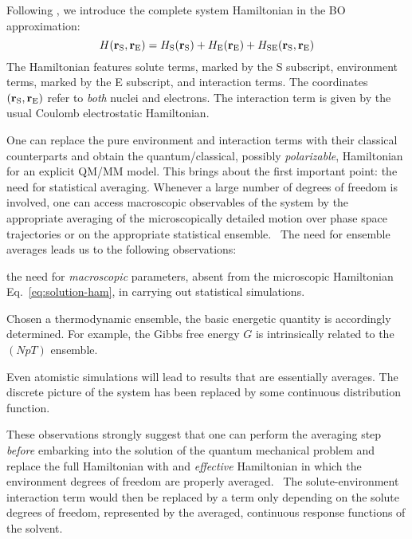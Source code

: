 Following \citeauthor{Tomasi2007-es}, we introduce the complete system
Hamiltonian in the \acs{BO} approximation:~\autocite{Tomasi2004-dc,
Tomasi2007-es}
\begin{equation}\label{eq:solution-ham}
 H(\mathbf{r}_\mathrm{S}, \mathbf{r}_\mathrm{E}) =
  H_\mathrm{S}(\mathbf{r}_\mathrm{S}) +  H_\mathrm{E}(\mathbf{r}_\mathrm{E})
+ H_\mathrm{SE}(\mathbf{r}_\mathrm{S}, \mathbf{r}_\mathrm{E})
\end{equation}
The Hamiltonian features solute terms, marked by the S subscript,
environment terms, marked by the E subscript, and interaction terms.
The coordinates $(\mathbf{r}_\mathrm{S}, \mathbf{r}_\mathrm{E})$ refer to
\emph{both} nuclei and electrons.
The interaction term is given by the usual Coulomb electrostatic
Hamiltonian.

One can replace the pure environment and interaction terms with their
classical counterparts and obtain the quantum/classical, possibly
\emph{polarizable}, Hamiltonian for an explicit \acs{QM}/\acs{MM} model.
This brings about the first important point: the need for statistical
averaging.
Whenever a large number of degrees of freedom is involved, one can
access macroscopic observables of the system by the appropriate
averaging of the microscopically detailed motion over phase space
trajectories or on the appropriate statistical
ensemble.~\autocite{Hill1960-ql}
The need for ensemble averages leads us to the following observations:
\begin{enumerate*}[label={\alph*)},font={\color{PMS1797}}]
 \item
   the need for \emph{macroscopic} parameters, absent from the
   microscopic Hamiltonian Eq.~\eqref{eq:solution-ham}, in carrying out
   statistical simulations.
 \item
   Chosen a thermodynamic ensemble, the basic energetic quantity is
   accordingly determined. For example, the Gibbs free energy  $G$ is
   intrinsically related to the $(NpT)$ ensemble.
 \item
   Even atomistic simulations will lead to results that are essentially
   averages. The discrete picture of the system has been replaced by
   some continuous distribution function.
\end{enumerate*}

These observations strongly suggest that one can perform the averaging
step \emph{before} embarking into the solution of the quantum mechanical
problem and replace the full Hamiltonian with and \emph{effective}
Hamiltonian in which the environment degrees of freedom are properly
averaged.~\autocite{Angyan1992-vo, Tapia1992-pu}
The solute-environment interaction term would then be replaced by
a term only depending on the solute degrees of freedom, represented by
the averaged, continuous response functions of the solvent.

